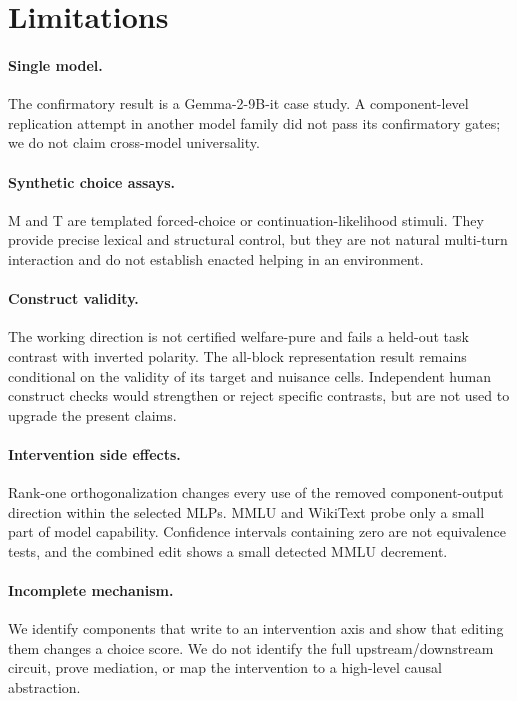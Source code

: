 \documentclass[10pt,twocolumn]{article}
\newcommand{\model}{Gemma-2-9B-it}
\begin{document}
\section{Limitations}

\paragraph{Single model.}
The confirmatory result is a \model{} case study. A component-level replication
attempt in another model family did not pass its confirmatory gates; we do not
claim cross-model universality.

\paragraph{Synthetic choice assays.}
M and T are templated forced-choice or continuation-likelihood stimuli. They
provide precise lexical and structural control, but they are not natural
multi-turn interaction and do not establish enacted helping in an environment.

\paragraph{Construct validity.}
The working direction is not certified welfare-pure and fails a held-out task
contrast with inverted polarity. The all-block representation result remains
conditional on the validity of its target and nuisance cells. Independent
human construct checks would strengthen or reject specific contrasts, but are
not used to upgrade the present claims.

\paragraph{Intervention side effects.}
Rank-one orthogonalization changes every use of the removed component-output
direction within the selected MLPs. MMLU and WikiText probe only a small part
of model capability. Confidence intervals containing zero are not equivalence
tests, and the combined edit shows a small detected MMLU decrement.

\paragraph{Incomplete mechanism.}
We identify components that write to an intervention axis and show that editing
them changes a choice score. We do not identify the full upstream/downstream
circuit, prove mediation, or map the intervention to a high-level causal
abstraction.
\end{document}
